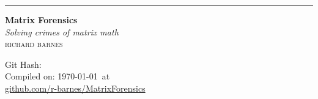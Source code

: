 \begin{titlepage} %
  \raggedleft %

  \rule{1pt}{\textheight} %
  \hspace{0.05\textwidth} %
  \parbox[b]{0.75\textwidth}{ %

    {\Huge\bfseries Matrix Forensics \\[\baselineskip]} %
    {\large\textit{Solving crimes of matrix math}}\\[4\baselineskip] %
    {\Large\textsc{richard barnes}} %
    \\[4\baselineskip]
    \immediate{}

    Git Hash:  \\
    Compiled on: \today\ at \currenttime
    \\[2\baselineskip]
    \href{https://github.com/r-barnes/MatrixForensics}{github.com/r-barnes/MatrixForensics}

    \vspace{0.4\textheight} %

  }

\end{titlepage}